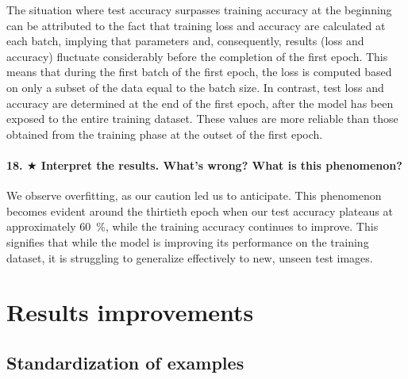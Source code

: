 The situation where test accuracy surpasses training accuracy at the beginning can be attributed to the fact that training loss and accuracy are calculated at each batch, implying that parameters and, consequently, results (loss and accuracy) fluctuate considerably before the completion of the first epoch. This means that during the first batch of the first epoch, the loss is computed based on only a subset of the data equal to the batch size. In contrast, test loss and accuracy are determined at the end of the first epoch, after the model has been exposed to the entire training dataset. These values are more reliable than those obtained from the training phase at the outset of the first epoch.




\paragraph{18. $ \bigstar $ Interpret the results. What's wrong? What is this phenomenon?}
We observe overfitting, as our caution led us to anticipate. This phenomenon becomes evident around the thirtieth epoch when our test accuracy plateaus at approximately 60~\%, while the training accuracy continues to improve. This signifies that while the model is improving its performance on the training dataset, it is struggling to generalize effectively to new, unseen test images.

\section{Results improvements}
\subsection{Standardization of examples}
